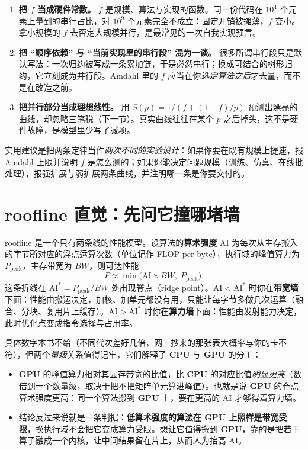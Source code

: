 \documentclass[12pt,a4paper,fontset=fandol]{ctexbook}
\newcommand{\Dom}[1]{\textsf{\bfseries #1}}
\newcommand{\CPU}{\Dom{CPU}}
\newcommand{\GPU}{\Dom{GPU}}
\begin{document}
\begin{warning}[title={用 Amdahl 论证``并行没用''的三种错误前提}]
\begin{enumerate}
\item \textbf{把 $f$ 当成硬件常数。} $f$ 是规模、算法与实现的函数。同一份代码在 $10^{4}$ 个元素上量到的串行占比，对 $10^{9}$ 个元素完全不成立：固定开销被摊薄，$f$ 变小。拿小规模的 $f$ 去否定大规模并行，是最常见的一次自我实现预言。
\item \textbf{把 ``顺序依赖'' 与 ``当前实现里的串行段'' 混为一谈。} 很多所谓串行段只是默认写法：一次归约被写成一条累加链，于是必然串行；换成可结合的树形归约，它立刻成为并行段。Amdahl 里的 $f$ 应当在你\emph{选定算法之后}才去量，而不是在改造之前。
\item \textbf{把并行部分当成理想线性。} 用 $S(p)=1/(f+(1-f)/p)$ 预测出漂亮的曲线，却忽略三笔税（下一节）。真实曲线往往在某个 $p$ 之后掉头，这不是硬件故障，是模型里少写了减项。
\end{enumerate}
\end{warning}

实用建议是把两条定律当作\emph{两次不同的实验设计}：如果你要在既有规模上提速，报 Amdahl 上限并说明 $f$ 是怎么测的；如果你能决定问题规模（训练、仿真、在线批处理），报强扩展与弱扩展两条曲线，并注明哪一条是你要交付的。

\section{roofline 直觉：先问它撞哪堵墙}

roofline 是一个只有两条线的性能模型。设算法的\textbf{算术强度} $\mathrm{AI}$ 为每次从主存搬入的字节所对应的浮点运算次数（单位记作 FLOP per byte），执行域的峰值算力为 $P_{\text{peak}}$，主存带宽为 $BW$，则可达性能
\[
P \approx \min\!\big(\mathrm{AI}\times BW,\; P_{\text{peak}}\big).
\]
这条折线在 $\mathrm{AI}^{\ast}=P_{\text{peak}}/BW$ 处出现脊点（ridge point）。$\mathrm{AI}<\mathrm{AI}^{\ast}$ 时你在\textbf{带宽墙}下面：性能由搬运决定，加核、加单元都没有用，只能让每字节多做几次运算（融合、分块、复用片上缓存）。$\mathrm{AI}>\mathrm{AI}^{\ast}$ 时你在\textbf{算力墙}下面：性能由发射能力决定，此时优化点变成指令选择与占用率。

具体数字本书不给（不同代次差好几倍，网上抄来的那张表大概率与你的卡不符），但两个\emph{量级}关系值得记牢，它们解释了 \CPU{} 与 \GPU{} 的分工：
\begin{itemize}
\item \GPU{} 的峰值算力相对其显存带宽的比值，比 \CPU{} 的对应比值\emph{明显更高}（数倍到一个数量级，取决于把不把矩阵单元算进峰值）。也就是说 \GPU{} 的脊点算术强度更高：同一个算法搬到 \GPU{} 上，要在更高的 $\mathrm{AI}$ 才够得着算力墙。
\item 结论反过来说就是一条判据：\textbf{低算术强度的算法在 \GPU{} 上照样是带宽受限}，换执行域不会把它变成算力受限。想让它值得搬到 \GPU{}，靠的是把若干算子融成一个内核，让中间结果留在片上，从而人为抬高 $\mathrm{AI}$。
\end{itemize}
\end{document}
